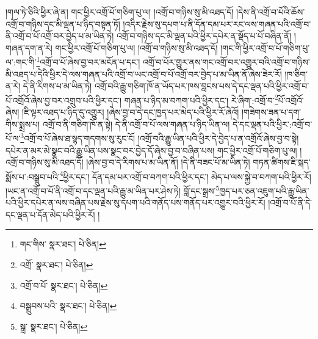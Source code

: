 །གལ་ཏེ་ཅིའི་ཕྱིར་ཞེ་ན། གང་ཕྱིར་འགྲོ་པོ་གཅིག་པུ་ལ། །འགྲོ་བ་གཉིས་སུ་མི་འཐད་དོ། །དེས་ནི་འགྲོ་བ་པོའི་ཆོས་འགྲོ་བ་གཉིས་དང་མི་ལྡན་པ་ཉིད་བསྟན་ཏོ། །འདིར་རྗེས་སུ་དཔག་པ་ནི་དོན་དམ་པར་རང་ལས་གཞན་པའི་འགྲོ་བ་ནི་འགྲོ་བ་པོ་འགྲོ་བར་བྱེད་པ་མ་ཡིན་ཏེ། འགྲོ་བ་གཉིས་དང་མི་ལྡན་པའི་ཕྱིར་དཔེར་ན་སྡོད་པ་པོ་བཞིན་ནོ། །གཞན་དག་ན་རེ། གང་ཕྱིར་འགྲོ་པོ་གཅིག་པུ་ལ། །འགྲོ་བ་གཉིས་སུ་མི་འཐད་དོ། །གང་གི་ཕྱིར་འགྲོ་བ་པོ་གཅིག་པུ་ལ་:གང་གི་\footnote{གང་གིས་  སྣར་ཐང་།  པེ་ཅིན། }འགྲོ་བ་པོ་ཞེས་བྱ་བར་མངོན་པ་དང་། འགྲོ་བ་པོར་གྱུར་ནས་གང་འགྲོ་བར་འགྱུར་བའི་འགྲོ་བ་གཉིས་མི་འཐད་པ་དེའི་ཕྱིར་དེ་ལས་གཞན་པའི་འགྲོ་བ་ཡང་འགྲོ་བ་པོ་འགྲོ་བར་བྱེད་པ་མ་ཡིན་ནོ་ཞེས་ཟེར་རོ། །ཁ་ཅིག་ན་རེ། དེ་ནི་རིགས་པ་མ་ཡིན་ཏེ། འགྲོ་བའི་རྒྱུ་གཅིག་ཁོ་ན་ཡོད་པར་ཁས་བླངས་པས་དེ་དང་ལྡན་པའི་ཕྱིར་འགྲོ་བ་པོ་འགྲོའོ་ཞེས་བྱ་བར་འགྲུབ་པའི་ཕྱིར་དང་། གཞན་པ་ཉིད་མ་བཀག་པའི་ཕྱིར་དང་། རེ་ཞིག་:འགྲོ་བ་\footnote{འགྲོ་  སྣར་ཐང་།  པེ་ཅིན། }པོ་འགྲོའོ་ཞེས། །ཇི་ལྟར་འཐད་པ་ཉིད་དུ་འགྱུར། །ཞེས་བྱ་བ་དེ་དང་ཁྱད་པར་མེད་པའི་ཕྱིར་རོ་ཞེའོ། །གཟེགས་ཟན་པ་དག་གིས་སྨྲས་པ། འགྲོ་བ་ནི་གཅིག་ཁོ་ན་སྟེ། དེ་ནི་འགྲོ་བ་པོ་ལས་གཞན་པ་ཉིད་ཡིན་ལ། དེ་དང་ལྡན་པའི་ཕྱིར་:འགྲོ་བ་པོ་ལ་\footnote{འགྲོ་བ་པོ་  སྣར་ཐང་།  པེ་ཅིན། }འགྲོ་བ་པོ་ཞེས་ཐ་སྙད་གདགས་སུ་རུང་ངོ། །འགྲོ་བའི་རྒྱུ་ཡིན་པའི་ཕྱིར་དེ་བྱེད་པ་ན་འགྲོའོ་ཞེས་བྱ་བ་སྟེ། དཔེར་ན་མར་མེ་སྣང་བའི་རྒྱུ་ཡིན་པས་སྣང་བར་བྱེད་དོ་ཞེས་བྱ་བ་བཞིན་པས། གང་ཕྱིར་འགྲོ་པོ་གཅིག་པུ་ལ། །འགྲོ་བ་གཉིས་སུ་མི་འཐད་དོ། །ཞེས་བྱ་བ་དེ་རིགས་པ་མ་ཡིན་ནོ། །དེ་ནི་བཟང་པོ་མ་ཡིན་ཏེ། གཏན་ཚིགས་ཇི་སྐད་སྨོས་པ་:བསྒྲུབ་པའི་\footnote{བསྒྲུབས་པའི་  སྣར་ཐང་།  པེ་ཅིན། }ཕྱིར་དང་། དོན་དམ་པར་འགྲོ་བ་བཀག་པའི་ཕྱིར་དང་། མེད་པ་ལས་སྐྱེ་བ་བཀག་པའི་ཕྱིར་རོ། །ཡང་ན་འགྲོ་བ་པོ་ནི་འགྲོ་བ་དང་ལྡན་པའི་རྒྱུ་མ་ཡིན་པར་ཤེས་ཏེ། བློ་དང་སྒྲས་\footnote{སྒྲ་  སྣར་ཐང་།  པེ་ཅིན། }ཁྱད་པར་ཅན་འཇུག་པའི་རྒྱུ་ཡིན་པའི་ཕྱིར་དཔེར་ན་ལས་བཞིན་པས་རྗེས་སུ་དཔག་པའི་གནོད་པས་གནོད་པར་འགྱུར་བའི་ཕྱིར་རོ། །འགྲོ་བ་པོ་ནི་དེ་དང་ལྡན་པ་དོན་མེད་པའི་ཕྱིར་རོ། །
